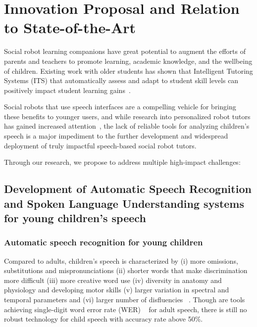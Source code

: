 
\section{Innovation Proposal and Relation to State-of-the-Art}

Social robot learning companions have great potential to augment the efforts of parents and teachers to promote learning, academic knowledge, and the wellbeing of children. Existing work with older students has shown that Intelligent Tutoring Systems (ITS) that automatically assess and adapt to student skill levels can positively impact student learning gains~\cite{desmarais2012review}. 


Social robots that use speech interfaces are a compelling vehicle for bringing these benefits to younger users, and while research into personalized robot tutors has gained increased attention~\cite{leyzberg2014personalizing}, the lack of reliable tools for analyzing children's speech is a major impediment to the further development and widespread deployment of truly impactful speech-based social robot tutors.

Through our research, we propose to address multiple high-impact challenges:

\subsection{Development of Automatic Speech Recognition and Spoken Language Understanding systems for young children's speech}
\label{section_ASR}
\subsubsection{Automatic speech recognition for young children}
Compared to adults, children's speech is characterized by (i) more omissions, substitutions and mispronunciations (ii) shorter words that make discrimination more difficult (iii) more creative word use (iv) diversity in anatomy and physiology and developing motor skills (v) larger variation in spectral and temporal parameters and (vi) larger number of disfluencies ~\cite{kennedy2017child, fainberg2016improving}. Though are tools achieving single-digit word error rate (WER) ~\cite{saon2015ibm, price2009assessment} for adult speech, there is still no robust technology for child speech with accuracy rate above 50\%.

